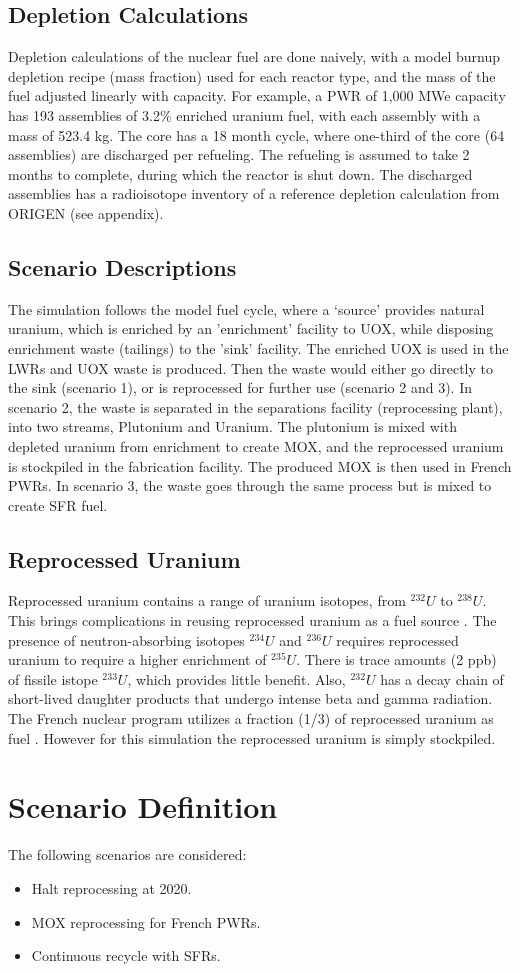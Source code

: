 \subsection{Depletion Calculations}
Depletion calculations of the nuclear fuel are done
naively, with a model burnup depletion recipe (mass fraction) used
for each reactor type, and the mass of the fuel 
adjusted linearly with capacity. For example, a PWR of
1,000 MWe capacity has 193 assemblies of 3.2\% enriched
uranium fuel, with each assembly with a mass of 523.4 kg.
The core has a 18 month cycle, where one-third of the 
core (64 assemblies) are discharged per refueling. The refueling
is assumed to take 2 months to complete, during which the reactor
is shut down. The discharged
assemblies has a radioisotope inventory of a reference
depletion calculation from ORIGEN (see appendix).


\subsection{Scenario Descriptions}
The simulation follows the model fuel cycle, where a `source'
provides natural uranium, which is enriched by an 'enrichment'
facility to \gls{UOX}, while disposing enrichment waste (tailings)
to the 'sink' facility. The enriched \gls{UOX} is used
in the \gls{LWR}s and \gls{UOX} waste is produced. Then the waste
would either go directly to the sink (scenario 1), or is reprocessed
for further use (scenario 2 and 3). In scenario 2, the waste is 
separated in the separations facility (reprocessing plant), into
two streams, Plutonium and Uranium. The plutonium is mixed with depleted uranium from enrichment
to create \gls{MOX}, and the reprocessed uranium is stockpiled in the fabrication facility.
The produced \gls{MOX} is then used in French \gls{PWR}s.
In scenario 3, the waste goes through the same process but is mixed
to create \gls{SFR} fuel.

\subsection{Reprocessed Uranium}
Reprocessed uranium contains a range of uranium isotopes, from $^{232}U$ to $^{238}U$.
This brings complications in reusing reprocessed uranium as a fuel source \cite{IAEA_management_2007}.
The presence of neutron-absorbing isotopes $^{234}U$ and $^{236}U$ requires reprocessed uranium
to require a higher enrichment of $^{235}U$. There is trace amounts (2 ppb) of fissile istope $^{233}U$,
which provides little benefit.  
Also, $^{232}U$ has a decay chain of short-lived
daughter products that undergo intense beta and gamma radiation.
The French nuclear program utilizes a fraction (1/3) of reprocessed uranium as fuel \cite{IAEA_management_200&}.
However for this simulation the reprocessed uranium is simply stockpiled.


\section{Scenario Definition}
The following scenarios are considered: 
\begin{itemize}
	\item Halt reprocessing at 2020.
	\item \gls{MOX} reprocessing for French \gls{PWR}s.
	\item Continuous recycle with \gls{SFR}s.
\end{itemize}
